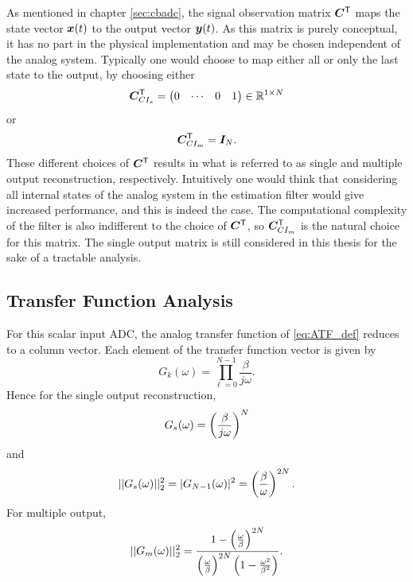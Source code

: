 As mentioned in chapter \ref{sec:cbadc}, the signal observation matrix $\bm{C}^\mathsf{T}$ maps the state vector $\bm{x}(t)$ to the output vector $\bm{y}(t)$. As this matrix is purely conceptual, it has no part in the physical implementation and may be chosen independent of the analog system. Typically one would choose to map either all or only the last state to the output, by choosing either
\begin{equation}
    \label{eq:ci_cmats}
    \bm{C}^\mathsf{T}_{CI_s} =
        \begin{pmatrix}
            0 & \cdots & 0 & 1
        \end{pmatrix}
        \in \mathbb{R}^{1 \times N}
\end{equation}
or
\begin{equation}
    \label{eq:ci_cmatm}
    \bm{C}^\mathsf{T}_{CI_m} = \bm{I}_{N}.
\end{equation}
These different choices of $\bm{C}^\mathsf{T}$ results in what is referred to as single and multiple output reconstruction, respectively. Intuitively one would think that considering all internal states of the analog system in the estimation filter would give increased performance, and this is indeed the case. The computational complexity of the filter is also indifferent to the choice of $\bm{C}^\mathsf{T}$, so $\bm{C}^\mathsf{T}_{CI_m}$ is the natural choice for this matrix. The single output matrix is still considered in this thesis for the sake of a tractable analysis.


\subsection{Transfer Function Analysis}
For this scalar input ADC, the analog transfer function of \ref{eq:ATF_def} reduces to a column vector. Each element of the transfer function vector is given by
\begin{equation}
    G_k(\omega) = \prod_{\ell = 0}^{N-1} \frac{\beta}{j \omega}.
\end{equation}
Hence for the single output reconstruction,
\begin{equation}
    G_s(\omega) = \left( \frac{\beta}{j\omega} \right)^N
\end{equation}
and
\begin{equation}
    \label{eq:atf_ci_single}
    ||G_s(\omega)||_{2}^2 = |G_{N-1}(\omega)|^2 = \left(\frac{\beta}{\omega}\right)^{2N}.
\end{equation}
For multiple output,
\begin{equation}
    ||G_m(\omega)||_{2}^2 = \frac{1- \left( \frac{\omega}{\beta} \right)^{2N}}{ \left( \frac{\omega}{\beta} \right)^{2N} \left( 1 - \frac{\omega^2}{\beta^2} \right) }.
\end{equation}

